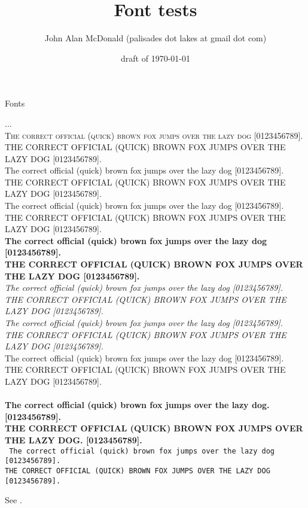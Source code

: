 \documentclass[12pt]{PalisadesLakesArticle}
\title{Font tests}
\author{John Alan McDonald 
(palisades dot lakes at gmail dot com)}
\date{draft of \today}
\begin{document}
\def\sharedFolder{../shared/}

\begin{plSection}{Fonts}

...\\
\textsc{
The correct official (quick) brown fox jumps over the lazy dog [0123456789].\\
THE CORRECT OFFICIAL (QUICK) BROWN FOX JUMPS OVER THE LAZY DOG [0123456789].\\
}
\textrm{
The correct official (quick) brown fox jumps over the lazy dog [0123456789].\\
THE CORRECT OFFICIAL (QUICK) BROWN FOX JUMPS OVER THE LAZY DOG [0123456789].\\
}
\textmd{
The correct official (quick) brown fox jumps over the lazy dog [0123456789].\\
THE CORRECT OFFICIAL (QUICK) BROWN FOX JUMPS OVER THE LAZY DOG [0123456789].\\
}
\textbf{
The correct official (quick) brown fox jumps over the lazy dog [0123456789].\\
THE CORRECT OFFICIAL (QUICK) BROWN FOX JUMPS OVER THE LAZY DOG [0123456789].\\
}
\textit{
The correct official (quick) brown fox jumps over the lazy dog [0123456789].\\
THE CORRECT OFFICIAL (QUICK) BROWN FOX JUMPS OVER THE LAZY DOG [0123456789].\\
}
\textsl{
The correct official (quick) brown fox jumps over the lazy dog [0123456789].\\
THE CORRECT OFFICIAL (QUICK) BROWN FOX JUMPS OVER THE LAZY DOG [0123456789].\\
}
\textsf{
The correct official (quick) brown fox jumps over the lazy dog [0123456789].\\
THE CORRECT OFFICIAL (QUICK) BROWN FOX JUMPS OVER THE LAZY DOG [0123456789].\\
}
\textsf{\textbf{\\
The correct official (quick) brown fox jumps over the lazy dog. [0123456789].\\
THE CORRECT OFFICIAL (QUICK) BROWN FOX JUMPS OVER THE LAZY DOG. [0123456789].\\
}}
\texttt{
The correct official (quick) brown fox jumps over the lazy dog [0123456789].\\
THE CORRECT OFFICIAL (QUICK) BROWN FOX JUMPS OVER THE LAZY DOG [0123456789].\\
}


See 
.

\end{plSection}%
\end{document}
